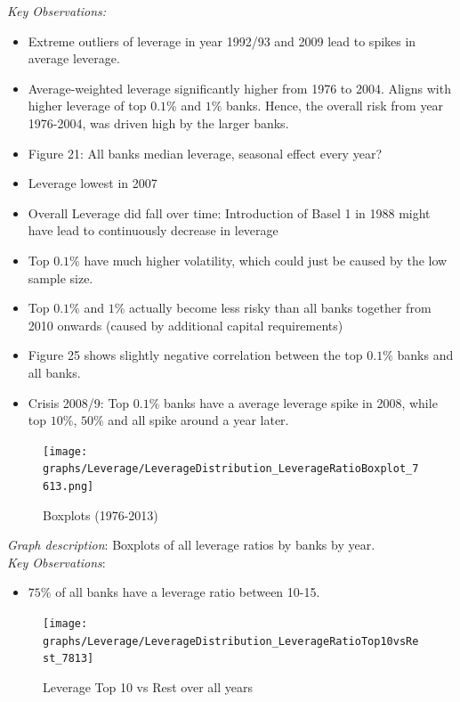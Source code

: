 \documentclass[12pt, a4paper]{article} %
\begin{document}
\noindent \textit{Key Observations:}
\begin{itemize}
\item Extreme outliers of leverage in year 1992/93 and 2009 lead to spikes in average leverage.
\item Average-weighted leverage significantly higher from 1976 to 2004. Aligns with higher leverage of top $0.1\%$ and $1\%$ banks. Hence, the overall risk from year 1976-2004, was driven high by the larger banks. 
\item Figure 21: All banks median leverage, seasonal effect every year?
\item Leverage lowest in 2007
\item Overall Leverage did fall over time: Introduction of Basel 1 in 1988 might have lead to continuously decrease in leverage
\item Top $0.1\%$ have much higher volatility, which could just be caused by the low sample size.
\item Top $0.1\%$ and $1\%$ actually become less risky than all banks together from 2010 onwards (caused by additional capital requirements)
\item Figure 25 shows slightly negative correlation between the top $0.1\%$ banks and all banks. 
\item Crisis 2008/9: Top $0.1\%$ banks have a average leverage spike in 2008, while top $10\%$, $50\%$ and all  spike around a year later.  
\end{itemize}


\newpage

\begin{figure}[hbtp]
\centering
\caption{Boxplots (1976-2013)}
\texttt{[image: graphs/Leverage/LeverageDistribution\_LeverageRatioBoxplot\_7613.png]}
\end{figure}

\noindent \textit{Graph description}: Boxplots of all leverage ratios by banks by year. 
\\

\noindent \textit{Key Observations}:
\begin{itemize}
\item $75\%$ of all banks have a leverage ratio between 10-15.
\end{itemize}




\begin{figure}[hbtp]
\centering
\caption{Leverage Top 10 vs Rest over all years}
\texttt{[image: graphs/Leverage/LeverageDistribution\_LeverageRatioTop10vsRest\_7813]}
\end{figure}
\end{document}
